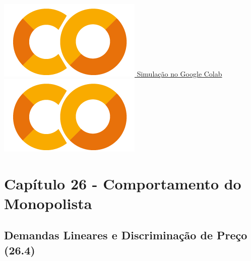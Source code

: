 \documentclass[a4paper,11pt,oneside]{book}
\theoremstyle{definition}
\theoremstyle{break}
\begin{document}
\begin{center}
\\
\ 
\\
\href{https://colab.research.google.com/drive/1MRJb9DZ7n_Hz2Kp9ng8K7pOcb1DTy_u5?usp=sharing}{\includegraphics[scale=0.08]{_colab_logo.png} Simulação no Google Colab \includegraphics[scale=0.08]{_colab_logo.png}}
\end{center}


\section*{Capítulo 26 - Comportamento do Monopolista}

\subsection*{Demandas Lineares e Discriminação de Preço (26.4)}
\end{document}
